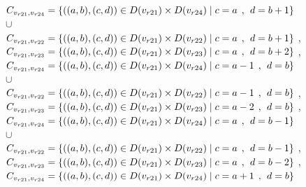 \\$C_{v_{r21},v_{r24}}=\{((a,b),(c,d))\in D(v_{r21}) \times D(v_{r24})\mid c = a   \hspace{1ex} , \hspace{1ex}  d = b + 1 \}$  
\\$\cup$
\\$C_{v_{r21},v_{r22}}=\{((a,b),(c,d))\in D(v_{r21}) \times D(v_{r22})\mid c = a  \hspace{1ex} , \hspace{1ex}  d = b + 1 \}$ , 
\\$C_{v_{r21},v_{r23}}=\{((a,b),(c,d))\in D(v_{r21}) \times D(v_{r23})\mid c = a  \hspace{1ex} , \hspace{1ex}  d = b + 2 \}$ , 
\\$C_{v_{r21},v_{r24}}=\{((a,b),(c,d))\in D(v_{r21}) \times D(v_{r24})\mid c = a - 1\hspace{1ex} , \hspace{1ex}  d = b    \}$  
\\$\cup$
\\$C_{v_{r21},v_{r22}}=\{((a,b),(c,d))\in D(v_{r21}) \times D(v_{r22})\mid c = a - 1\hspace{1ex} , \hspace{1ex}  d = b   \}$ , 
\\$C_{v_{r21},v_{r23}}=\{((a,b),(c,d))\in D(v_{r21}) \times D(v_{r23})\mid c = a - 2\hspace{1ex} , \hspace{1ex}  d = b   \}$ , 
\\$C_{v_{r21},v_{r24}}=\{((a,b),(c,d))\in D(v_{r21}) \times D(v_{r24})\mid c = a  \hspace{1ex} , \hspace{1ex}  d = b - 1 \}$  
\\$\cup$
\\$C_{v_{r21},v_{r22}}=\{((a,b),(c,d))\in D(v_{r21}) \times D(v_{r22})\mid c = a   \hspace{1ex} , \hspace{1ex}  d = b - 1 \}$ , 
\\$C_{v_{r21},v_{r23}}=\{((a,b),(c,d))\in D(v_{r21}) \times D(v_{r23})\mid c = a   \hspace{1ex} , \hspace{1ex}  d = b - 2 \}$ , 
\\$C_{v_{r21},v_{r24}}=\{((a,b),(c,d))\in D(v_{r21}) \times D(v_{r24})\mid c = a + 1\hspace{1ex} , \hspace{1ex}  d = b   \}$  
